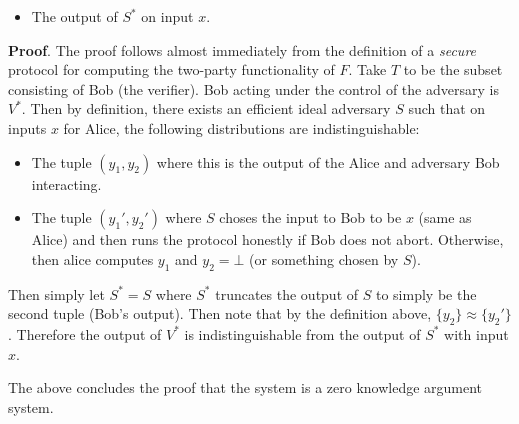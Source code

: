 \documentclass{article}
\begin{document}
\begin{enumerate}
\begin{itemize}[noitemsep,topsep=\mdcompacttopsep]
\item{}The output of $S^*$ on input $x$.%
\end{itemize}%

\begin{mdbmarginx}{1ex}{0pt}{1ex}{0pt}%
\noindent{}\textbf{Proof}.  The proof follows almost immediately from the definition of a \emph{secure} protocol for computing
the two-party functionality of $F$. Take $T$ to be the subset consisting of Bob (the verifier). 
Bob acting under the control of the adversary is $V^*$. Then by definition, there exists 
an efficient ideal adversary $S$ such that on inputs $x$ for Alice, the following distributions
are indistinguishable:%

\begin{itemize}[noitemsep,topsep=\mdcompacttopsep]%

\item{}The tuple $(y_1,y_2)$ where this is the output of the Alice and adversary Bob interacting.%

\item{}The tuple $(y_1',y_2')$ where $S$ choses the input to Bob to be $x$ (same as Alice) 
and then runs the protocol honestly if Bob does not abort. Otherwise, then alice computes
$y_1$ and $y_2 = \bot$ (or something chosen by $S$).%
\end{itemize}%

\noindent{}Then simply let $S^* = S$ where $S^*$ truncates the output of $S$ to simply be the second tuple
(Bob's output). Then note that by the definition above, $\{y_2\} \approx \{y_2'\}$. Therefore the
output of $V^*$ is indistinguishable from the output of $S^*$ with input $x$.
\mdfloatright{\ensuremath{\Box}}%
\end{mdbmarginx}%

The above concludes the proof that the system is a zero knowledge argument system.%


\end{enumerate}
\end{document}
